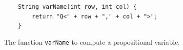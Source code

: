 \begin{figure}[!ht]
\centering
\begin{verbatim}
    String varName(int row, int col) {
        return "Q<" + row + "," + col + ">";
    }
\end{verbatim}
\vspace*{-0.3cm}
\caption{The function \texttt{varName} to compute a propositional variable.}
\label{fig:var}
\end{figure}



